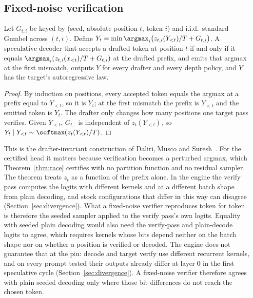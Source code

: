 \subsection{Fixed-noise verification}\label{sec:fixednoise}
\begin{theorem}\label{thm:fixednoise}
Let $G_{t,i}$ be keyed by (seed, absolute position $t$, token $i$) and i.i.d.\ standard Gumbel across $(t,i)$. Define $Y_t=\min\argmax_i\bigl(z_{t,i}(Y_{<t})/T+G_{t,i}\bigr)$. A speculative decoder that accepts a drafted token at position $t$ if and only if it equals $\argmax_i(z_{t,i}(x_{<t})/T+G_{t,i})$ at the drafted prefix, and emits that argmax at the first mismatch, outputs $Y$ for every drafter and every depth policy, and $Y$ has the target's autoregressive law.
\end{theorem}
\begin{proof}
By induction on positions, every accepted token equals the argmax at a prefix equal to $Y_{<t}$, so it is $Y_t$; at the first mismatch the prefix is $Y_{<t}$ and the emitted token is $Y_t$. The drafter only changes how many positions one target pass verifies. Given $Y_{<t}$, $G_{t,\cdot}$ is independent of $z_t(Y_{<t})$, so $Y_t\mid Y_{<t}\sim\softmax(z_t(Y_{<t})/T)$.
\end{proof}
This is the drafter-invariant construction of Daliri, Musco and Suresh~\cite{daliri2025}. For the certified head it matters because verification becomes a perturbed argmax, which Theorem~\ref{thm:race} certifies with no partition function and no residual sampler. The theorem treats $z_t$ as a function of the prefix alone. In the engine the verify pass computes the logits with different kernels and at a different batch shape from plain decoding, and stock configurations that differ in this way can disagree (Section~\ref{sec:divergence}). What a fixed-noise verifier reproduces token for token is therefore the seeded sampler applied to the verify pass's own logits. Equality with seeded plain decoding would also need the verify-pass and plain-decode logits to agree, which requires kernels whose bits depend neither on the batch shape nor on whether a position is verified or decoded. The engine does not guarantee that at the pin: decode and target verify use different recurrent kernels, and on every prompt tested their outputs already differ at layer 0 in the first speculative cycle (Section~\ref{sec:divergence}). A fixed-noise verifier therefore agrees with plain seeded decoding only where those bit differences do not reach the chosen token.

